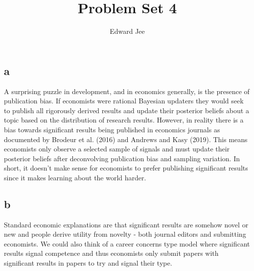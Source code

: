 \documentclass{article}
\author{Edward Jee}
\title{Problem Set 4}
\begin{document}
\maketitle


\subsection*{a}
A surprising puzzle in development, and in economics generally, is the presence 
of publication bias. If economists were rational Bayesian updaters they would 
seek to publish all rigorously derived results and update their posterior beliefs 
about a topic based on the distribution of research results. However, in reality 
there is a bias towards significant results being published in economics journals 
as documented by Brodeur et al. (2016) and Andrews and Kasy (2019). This means 
economists only observe a selected sample of signals and must update their posterior 
beliefs after deconvolving publication bias and sampling variation.
In short, it doesn't make sense for economists to prefer publishing significant results 
since it makes learning about the world harder. 


\subsection*{b}

Standard economic explanations are that significant results are somehow novel 
or new and people derive utility from novelty - both journal editors and 
submitting economists. We could also think of a 
career concerns type model where significant results signal competence and thus 
economists only submit papers with significant results in papers to try and signal 
their type.








    
\end{document}
